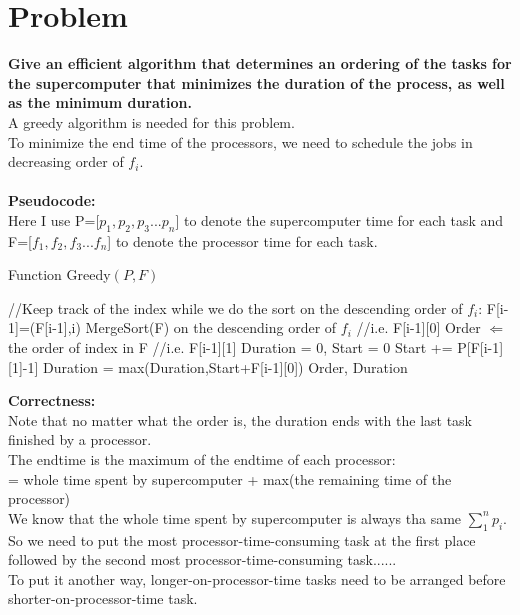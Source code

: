 \documentclass{article}
\begin{document}
\section{Problem \uppercase\expandafter{}}
\textbf{Give an efficient algorithm that determines an ordering of the tasks for the supercomputer
that minimizes the duration of the process, as well as the minimum duration.}\\
A greedy algorithm is needed for this problem.\\
To minimize the end time of the processors, we need to schedule the jobs in decreasing order of $f_i$.\\\\
\textbf{\large Pseudocode:}\\
Here I use P=[$p_1,p_2,p_3...p_n$] to denote the supercomputer time for each task and F=[$f_1,f_2,f_3...f_n$] to denote the processor time for each task.\\
\begin{algorithm}[H]
  \caption{Function Greedy$(P,F)$}
  \label{alg1}
  \begin{algorithmic}
  \STATE //Keep track of the index while we do the sort on the descending order of $f_i$:
  \STATE F[i-1]=(F[i-1],i) 
  \ENDFOR
  \STATE MergeSort(F) on the descending order of $f_i$      //i.e. F[i-1][0]
  \STATE Order $\Longleftarrow$ the order of index in F      //i.e. F[i-1][1]
  \STATE Duration = 0, Start = 0
  \STATE Start += P[F[i-1][1]-1]
  \STATE Duration = max(Duration,Start+F[i-1][0])
  \ENDFOR
  \RETURN Order, Duration
  \end{algorithmic}
\end{algorithm}
\noindent\textbf{\large Correctness:\\}
Note that no matter what the order is, the duration ends with the last task finished by a processor.\\
The endtime is the maximum of the endtime of each processor:\\
= whole time spent by supercomputer + max(the remaining time of the processor)\\
We know that the whole time spent by supercomputer is always tha same $\sum_1^n p_i$. So we need to put the most processor-time-consuming task at the first place followed by the second most processor-time-consuming task......\\
To put it another way, longer-on-processor-time tasks  need to be arranged before shorter-on-processor-time task.\\
\end{document}
